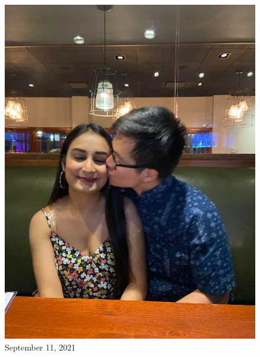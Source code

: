 \documentclass[
]{book}
\begin{document}
\begin{figure}
\centering
\includegraphics[width=5.20833in,height=\textheight]{mimages/13.1 9-11-2021.jpg}
\caption{September 11, 2021}
\end{figure}
\end{document}
